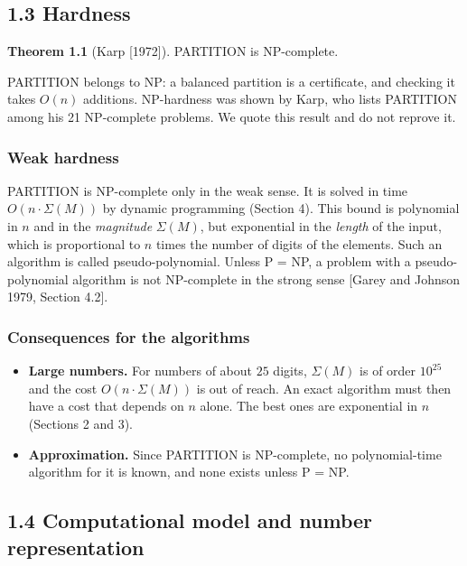 \documentclass[
]{article}
\providecommand{\tightlist}{%
  \setlength{\itemsep}{0pt}\setlength{\parskip}{0pt}}
\begin{document}
\hypertarget{hardness}{%
\subsection{1.3 Hardness}\label{hardness}}

\textbf{Theorem 1.1} (Karp {[}1972{]}). PARTITION is NP-complete.

PARTITION belongs to NP: a balanced partition is a certificate, and
checking it takes \(O(n)\) additions. NP-hardness was shown by Karp, who
lists PARTITION among his 21 NP-complete problems. We quote this result
and do not reprove it.

\hypertarget{weak-hardness}{%
\subsubsection{Weak hardness}\label{weak-hardness}}

PARTITION is NP-complete only in the weak sense. It is solved in time
\(O(n \cdot \Sigma(M))\) by dynamic programming (Section 4). This bound
is polynomial in \(n\) and in the \emph{magnitude} \(\Sigma(M)\), but
exponential in the \emph{length} of the input, which is proportional to
\(n\) times the number of digits of the elements. Such an algorithm is
called pseudo-polynomial. Unless P = NP, a problem with a
pseudo-polynomial algorithm is not NP-complete in the strong sense
{[}Garey and Johnson 1979, Section 4.2{]}.

\hypertarget{consequences-for-the-algorithms}{%
\subsubsection{Consequences for the
algorithms}\label{consequences-for-the-algorithms}}

\begin{itemize}
\tightlist
\item
  \textbf{Large numbers.} For numbers of about \(25\) digits,
  \(\Sigma(M)\) is of order \(10^{25}\) and the cost
  \(O(n \cdot \Sigma(M))\) is out of reach. An exact algorithm must then
  have a cost that depends on \(n\) alone. The best ones are exponential
  in \(n\) (Sections 2 and 3).
\item
  \textbf{Approximation.} Since PARTITION is NP-complete, no
  polynomial-time algorithm for it is known, and none exists unless P =
  NP.
\end{itemize}

\hypertarget{computational-model-and-number-representation}{%
\subsection{1.4 Computational model and number
representation}\label{computational-model-and-number-representation}}
\end{document}
